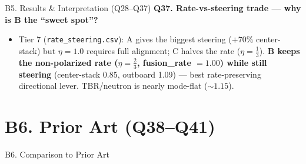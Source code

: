 \documentclass[11pt,aspectratio=169]{beamer}
\newcommand{\qitem}[1]{\medskip\textbf{#1}\par}
\begin{document}
\begin{frame}[allowframebreaks]{B5. Results \& Interpretation (Q28--Q37)}
\qitem{Q37. Rate-vs-steering trade --- why is B the ``sweet spot''?}
\begin{itemize}
\item Tier 7 (\texttt{rate\_steering.csv}): A gives the biggest steering ($+70\%$
      center-stack) but $\eta = 1.0$ requires full alignment; C halves the rate
      ($\eta = \tfrac13$). \textbf{B keeps the non-polarized rate ($\eta = \tfrac23$,
      fusion\_rate $= 1.00$) while still steering} (center-stack 0.85, outboard 1.09) --- best
      rate-preserving directional lever. TBR/neutron is nearly mode-flat ($\sim 1.15$).
\end{itemize}
\end{frame}

\section{B6. Prior Art (Q38--Q41)}
\begin{frame}
\centering\vfill
{\Large\color{key} B6. Comparison to Prior Art}\par
{}
\vfill
\end{frame}
\end{document}
